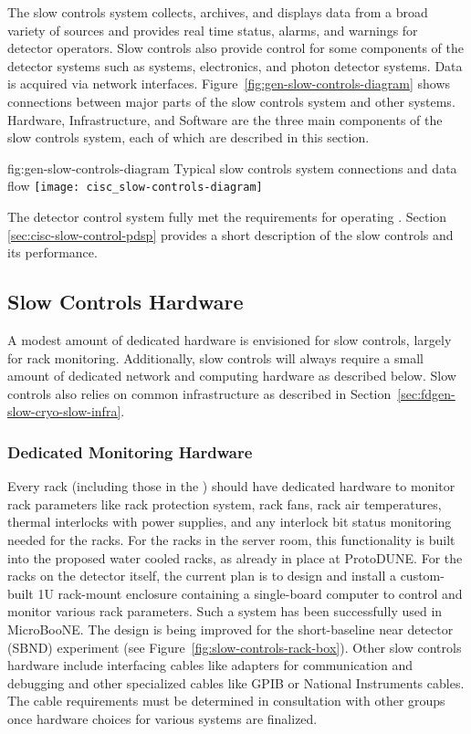 The slow controls system collects, archives, and displays data from
a broad variety of sources and provides real time status, alarms, and warnings for detector operators. Slow controls also provide control for some components of the detector systems such as  systems,  electronics, and photon detector systems. Data is acquired via network interfaces.  Figure~\ref{fig:gen-slow-controls-diagram} shows connections between major parts of the slow controls system and other systems. Hardware, Infrastructure, and Software are the three main components of the slow controls system, each of which are described in this section.

\begin{dunefigure}{fig:gen-slow-controls-diagram}
{Typical slow controls system connections and data flow}
\texttt{[image: cisc\_slow-controls-diagram]}
\end{dunefigure}

The  detector control system\cite{pdspdcs_proc} fully met the requirements for operating . Section \ref{sec:cisc-slow-control-pdsp} provides a short description of the  slow controls and its performance.

 \subsection{Slow Controls Hardware}
\label{sec:fdgen-slow-cryo-hdwr}

A modest amount of dedicated hardware is envisioned for slow controls, largely for rack monitoring. Additionally, slow controls will always require a small amount of dedicated network and
computing hardware as described below. Slow controls also relies on common
infrastructure as described in
Section~\ref{sec:fdgen-slow-cryo-slow-infra}.

\subsubsection{Dedicated Monitoring Hardware}
Every rack (including those in the ) should have dedicated hardware to monitor rack parameters like rack protection system, rack fans, rack air temperatures, thermal interlocks with power supplies, and any interlock bit status monitoring needed for the racks. For the racks in the  server room, this functionality is built into the proposed water cooled racks, as already in place at ProtoDUNE.  For the racks on the detector itself, the current plan is to design and install a custom-built 1U rack-mount enclosure containing a single-board computer to control and monitor various rack parameters. Such a system has been successfully used in MicroBooNE. The design is being improved for the short-baseline near detector (SBND) experiment (see Figure~\ref{fig:slow-controls-rack-box}). Other slow controls hardware include interfacing cables like adapters for communication and debugging and other specialized cables like GPIB or National Instruments cables. The cable requirements must be determined in consultation with other groups once hardware choices for various systems are finalized.

